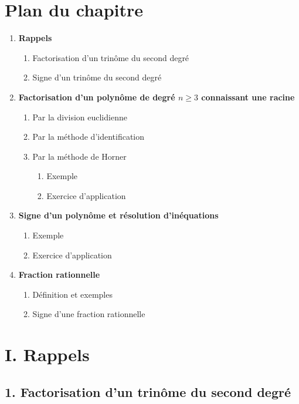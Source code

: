 \documentclass[12pt,a4paper]{article}
\newcounter{exemple}
\newcounter{solution}
\begin{document}
\section*{Plan du chapitre}
\begin{enumerate}
    \item \textbf{Rappels}
    \begin{enumerate}
        \item Factorisation d'un trinôme du second degré
        \item Signe d'un trinôme du second degré
    \end{enumerate}
    \item \textbf{Factorisation d'un polynôme de degré \( n \geq 3 \) connaissant une racine}
    \begin{enumerate}
        \item Par la division euclidienne
        \item Par la méthode d'identification
        \item Par la méthode de Horner
        \begin{enumerate}
            \item Exemple
            \item Exercice d'application
        \end{enumerate}
    \end{enumerate}
    \item \textbf{Signe d'un polynôme et résolution d'inéquations}
    \begin{enumerate}
        \item Exemple
        \item Exercice d'application
    \end{enumerate}
    \item \textbf{Fraction rationnelle}
    \begin{enumerate}
        \item Définition et exemples
        \item Signe d'une fraction rationnelle
    \end{enumerate}
\end{enumerate}

\newpage

\section*{I. Rappels}

\subsection*{1. Factorisation d'un trinôme du second degré}
\end{document}
